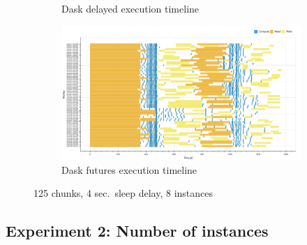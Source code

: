 \documentclass[conference]{IEEEtran}
\begin{document}
\begin{figure}[!t]
\begin{subfigure}[b]{\columnwidth}
        \caption{Dask delayed execution timeline}\label{fig:inc_dask_delayed_gantt}
    \end{subfigure}
    \hfill
    \begin{subfigure}[b]{\columnwidth}
        \includegraphics[clip,width=\columnwidth]{images/Dask_futures_inc_baseline_gantt.png}%
        \caption{Dask futures execution timeline}\label{fig:inc_dask_futures_gantt}
    \end{subfigure}
    \caption{125 chunks, 4 sec.\ sleep delay, 8 instances}
\end{figure}


\subsection{Experiment 2: Number of instances}
\end{document}

